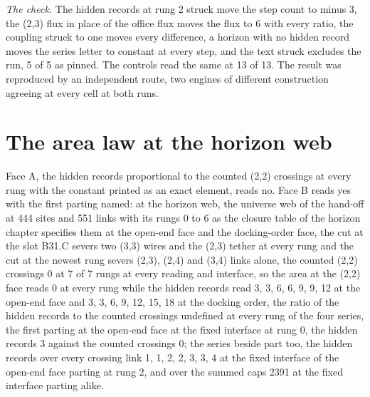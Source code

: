 \begin{chproof}
\textit{The check.} The hidden records at rung 2 struck move the step count to minus 3, the (2,3) flux in place of the office flux moves the flux to 6 with every ratio, the coupling struck to one moves every difference, a horizon with no hidden record moves the series letter to constant at every step, and the text struck excludes the run, 5 of 5 as pinned. The controls read the same at 13 of 13. The result was reproduced by an independent route, two engines of different construction agreeing at every cell at both runs.
\end{chproof}
\par\medskip{}\label{narr:close:10-2}\par
\section{The area law at the horizon web}\label{mod:X-2a-D542325-w-arlw}
\begin{chwall}\label{box:X-2a-D542325-w-arlw:1}
Face A, the hidden records proportional to the counted (2,2) crossings at every rung with the constant printed as an exact element, reads no. Face B reads yes with the first parting named: at the horizon web, the universe web of the hand-off at 444 sites and 551 links with its rungs 0 to 6 as the closure table of the horizon chapter specifies them at the open-end face and the docking-order face, the cut at the slot B31.C severs two (3,3) wires and the (2,3) tether at every rung and the cut at the newest rung severs (2,3), (2,4) and (3,4) links alone, the counted (2,2) crossings 0 at 7 of 7 rungs at every reading and interface, so the area at the (2,2) face reads 0 at every rung while the hidden records read 3, 3, 6, 6, 9, 9, 12 at the open-end face and 3, 3, 6, 9, 12, 15, 18 at the docking order, the ratio of the hidden records to the counted crossings undefined at every rung of the four series, the first parting at the open-end face at the fixed interface at rung 0, the hidden records 3 against the counted crossings 0; the series beside part too, the hidden records over every crossing link 1, 1, 2, 2, 3, 3, 4 at the fixed interface of the open-end face parting at rung 2, and over the summed caps 2391 at the fixed interface parting alike.
\end{chwall}
